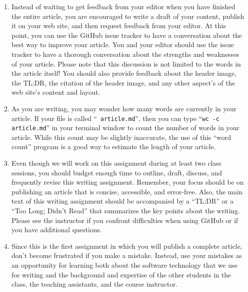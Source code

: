 \begin{enumerate}
  \item Instead of waiting to get feedback from your editor when you have finished the entire article, you are
    encouraged to write a draft of your content, publish it on your web site, and then request feedback from your
    editor. At this point, you can use the GitHub issue tracker to have a conversation about the best way to improve
    your article. You and your editor should use the issue tracker to have a thorough conversation about the strengths
    and weaknesses of your article. Please note that this discussion is not limited to the words in the article itself!
    You should also provide feedback about the header image, the TL;DR, the citation of the header image, and any other
    aspect's of the web site's content and layout.

  \item As you are writing, you may wonder how many words are currently in your article. If your file is called ``{\tt
    article.md}'', then you can type ``{\tt wc -c article.md}'' in your terminal window to count the number of words in
    your article. While this count may be slightly inaccurate, the use of this ``word count'' program is a good way to
    estimate the length of your article.

  \item Even though we will work on this assignment during at least two class sessions, you should budget enough time to
    outline, draft, discuss, and frequently revise this writing assignment. Remember, your focus should be on publishing
    an article that is concise, accessible, and error-free. Also, the main text of this writing assignment should be
    accompanied by a ``TL;DR'' or a ``Too Long; Didn't Read'' that summarizes the key points about the writing. Please
    see the instructor if you confront difficulties when using GitHub or if you have additional questions.

  \item Since this is the first assignment in which you will publish a complete article, don't become frustrated if you
    make a mistake. Instead, use your mistakes as an opportunity for learning both about the software technology that we
    use for writing and the background and expertise of the other students in the class, the teaching assistants, and
    the course instructor.

\end{enumerate}

\vspace*{-.15in}

